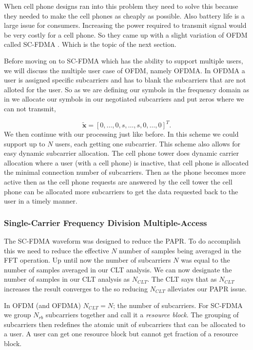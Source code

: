 When cell phone designs ran into this problem they need to solve this because they needed to make the cell phones as cheaply as possible. Also battery life is a large issue for consumers. Increasing the power required to transmit signal would be very costly for a cell phone. So they came up with a slight variation of \ac{OFDM} called \ac{SC-FDMA} \cite{LTEBook}. Which is the topic of the next section.

Before moving on to \ac{SC-FDMA} which has the ability to support multiple users, we will discuss the multiple user case of \ac{OFDM}, namely \ac{OFDMA}. In \ac{OFDMA} a user is assigned specific subcarriers and has to blank the subcarriers that are not alloted for the user. So as we are defining our symbols in the frequency domain as in  we allocate our symbols in our negotiated subcarriers and put zeros where we can not transmit,

\begin{equation}
\tilde{\mathbf{x}}=\left[0,\dots,0,s,\dots,s,0,\dots,0\right]^T.
\end{equation}
\noindent
We then continue with our processing just like before. In this scheme we could support up to $N$ users, each getting one subcarrier. This scheme also allows for easy dynamic subcarrier allocation. The cell phone tower does dynamic carrier allocation where a user (with a cell phone) is inactive, that cell phone is allocated the minimal connection number of subcarriers. Then as the phone becomes more active then as the cell phone requests are answered by the cell tower the cell phone can be allocated more subcarriers to get the data requested back to the user in a timely manner. 
	
\subsubsection{Single-Carrier Frequency Division Multiple-Access}

The \ac{SC-FDMA} waveform was designed to reduce the \ac{PAPR}. To do accomplish this we need to reduce the effective $N$ number of samples being averaged in the \ac{FFT} operation. Up until now the number of subcarriers $N$ was equal to the number of samples averaged in our \ac{CLT} analysis. We can now designate the number of samples in our \ac{CLT} analysis as $N_{CLT}$. The \ac{CLT} says that as $N_{CLT}$ increases the result converges to the  so reducing $N_{CLT}$ alleviates our \ac{PAPR} issue.

In \ac{OFDM} (and \ac{OFDMA}) $N_{CLT}=N$; the number of subcarriers. For \ac{SC-FDMA} we group $N_{rb}$ subcarriers together and call it a \emph{resource block}. The grouping of subcarriers then redefines the atomic unit of subcarriers that can be allocated to a user. A user can get one resource block but cannot get fraction of a resource block.


